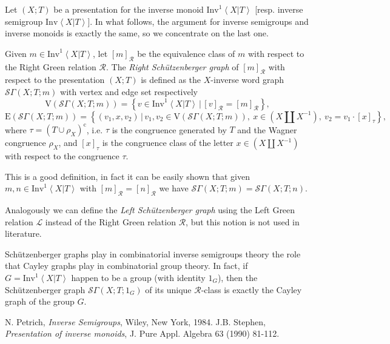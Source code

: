 \documentclass[12pt]{article}
\begin{document}




\newcommand{\V}{\mathrm{V}}
\newcommand{\E}{\mathrm{E}}
\newcommand{\schG}{\mathcal{S}\Gamma}

\newcommand{\e}{\mathrm{e}}
\newcommand{\co}{\mathrm{c}}

\newcommand{\cbra}[1]{\left( #1 \right)}
\newcommand{\qbra}[1]{\left[ #1 \right]}
\newcommand{\gbra}[1]{\left\{ #1 \right\}}
\newcommand{\abra}[1]{\left\langle #1 \right\rangle}

\newcommand{\mipres}[2]{\mathrm{Inv}^1\abra{#1 | #2}}
\newcommand{\sipres}[2]{\mathrm{Inv}\abra{#1 | #2}}

\newcommand{\double}[1]{\cbra{#1\amalg #1^{-1}}}
\newcommand{\doubles}[1]{\cbra{#1\amalg #1^{-1}}^\ast}
\newcommand{\doublep}[1]{\cbra{#1\amalg #1^{-1}}^+}

Let $(X;T)$ be a presentation for the inverse monoid $\mipres{X}{T}$ [resp.  inverse semigroup $\sipres{X}{T}$]. In what   follows, the argument for inverse semigroups and inverse monoids is exactly the same, so we concentrate on the last one.

Given $m\in \mipres{X}{T}$, let $[m]_{\mathcal{R}}$ be the equivalence class of $m$ with respect to the Right Green relation $\mathcal{R}$. The \emph{Right Sch\"{u}tzenberger graph} of $[m]_{\mathcal{R}}$ with respect to the presentation $(X;T)$ is defined as the $X$-inverse word graph $\schG(X;T;m)$ with vertex and edge set respectively
$$\V(\schG(X;T;m))=\gbra{v\in \mipres{X}{T}\,|\,[v]_{\mathcal{R}}= [m]_{\mathcal{R}}},$$
$$\E(\schG(X;T;m))=\gbra{(v_1,x,v_2)\,|\,v_1,v_2\in \V(\schG(X;T;m)),\ x\in\double{X},\ v_2=v_1
\cdot [x]_\tau},$$
where $\tau=(T\cup\rho_X)^\co$, i.e. $\tau$ is the congruence generated by $T$ and the Wagner congruence $\rho_X$, and $[x]_\tau$ is the congruence class of the letter $x\in\double X$ with respect to the congruence $\tau$.

This is a good definition, in fact it can be easily shown that given $m,n\in\mipres{X}{T}$ with $[m]_{\mathcal R}=[n]_{\mathcal R}$ we have $\schG(X;T;m)=\schG(X;T;n)$.



Analogously we can define the \emph{Left Sch\"{u}tzenberger graph} using the Left  Green relation $\mathcal{L}$ instead of the Right Green relation $\mathcal{R}$, but this notion is not used in literature.

Sch\"{u}tzenberger graphs play in combinatorial inverse semigroups theory the role that Cayley graphs play in combinatorial group theory. In fact, if $G=\mipres{X}{T}$ happen to be a group (with identity $1_G$), then the Sch\"{u}tzenberger graph $\schG{(X;T;1_G)}$ of its unique $\mathcal{R}$-class is exactly  the Cayley graph of the group $G$.

\begin{thebibliography}{9}
 N. Petrich, \emph{Inverse Semigroups}, Wiley, New York, 1984.
 J.B. Stephen, \emph{Presentation of inverse monoids}, J. Pure Appl. Algebra 63 (1990) 81-112.
\end{thebibliography}
\end{document}
